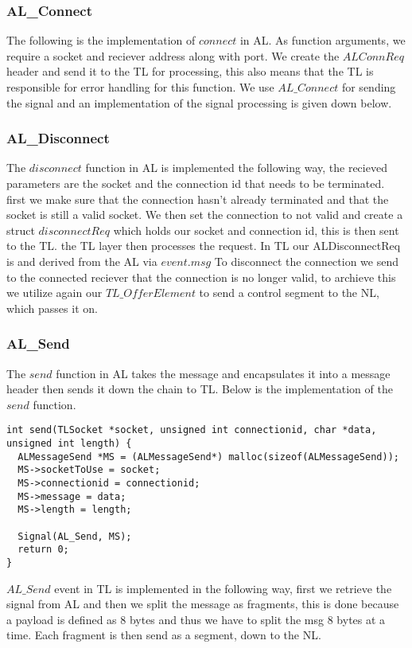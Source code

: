 \subsubsection{AL\_Connect}
The following is the implementation of $connect$ in AL.
As function arguments, we require a socket and reciever address along with port.
We create the $ALConnReq$ header and send it to the TL for processing,
this also means that the TL is responsible for error handling for this function.
We use $AL\_Connect$ for sending the signal and an implementation of the signal processing is given down below.

\subsubsection{AL\_Disconnect}

The $disconnect$ function in AL is implemented the following way, the recieved parameters are the socket and the connection id that needs to be terminated.
first we make sure that the connection hasn't already terminated and that the socket is still a valid socket.
We then set the connection to not valid and create a struct $disconnectReq$ which holds our socket and connection id, this is then sent to the TL.
the TL layer then processes the request.
In TL our ALDisconnectReq is and derived from the AL via $event.msg$
To disconnect the connection we send to the connected reciever that the connection is no longer valid, to archieve this
we utilize again our $TL\_OfferElement$ to send a control segment to the NL, which passes it on.

\subsubsection{AL\_Send}
The $send$ function in AL takes the message and encapsulates it into a message header then sends it down the chain to TL.
Below is the implementation of the $send$ function.
\begin{lstlisting}
int send(TLSocket *socket, unsigned int connectionid, char *data, unsigned int length) {
  ALMessageSend *MS = (ALMessageSend*) malloc(sizeof(ALMessageSend));
  MS->socketToUse = socket;
  MS->connectionid = connectionid;
  MS->message = data;
  MS->length = length;

  Signal(AL_Send, MS);
  return 0;
}
\end{lstlisting}

$AL\_Send$ event in TL is implemented in the following way, first we retrieve the signal from AL and then we split the message as fragments, this is done because a payload is defined as 8 bytes and thus we have to split the msg 8 bytes at a time. Each fragment is then send as a segment, down to the NL.




